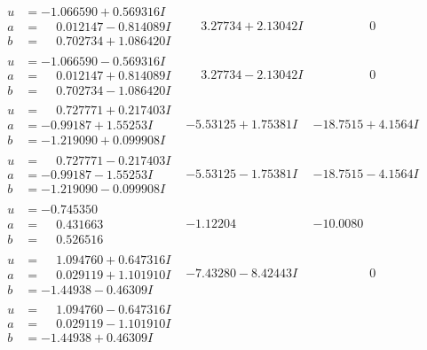 \documentclass[1p]{elsarticle_modified}
\theoremstyle{definition}
\begin{document}
$$\begin{array}{c|c|c}
\begin{aligned}
u &= -1.066590 + 0.569316 I \\
a &= \phantom{-}0.012147 - 0.814089 I \\
b &= \phantom{-}0.702734 + 1.086420 I\end{aligned}
 & \phantom{-}3.27734 + 2.13042 I & \phantom{-0.000000 } 0 \\ \hline\begin{aligned}
u &= -1.066590 - 0.569316 I \\
a &= \phantom{-}0.012147 + 0.814089 I \\
b &= \phantom{-}0.702734 - 1.086420 I\end{aligned}
 & \phantom{-}3.27734 - 2.13042 I & \phantom{-0.000000 } 0 \\ \hline\begin{aligned}
u &= \phantom{-}0.727771 + 0.217403 I \\
a &= -0.99187 + 1.55253 I \\
b &= -1.219090 + 0.099908 I\end{aligned}
 & -5.53125 + 1.75381 I & -18.7515 + 4.1564 I \\ \hline\begin{aligned}
u &= \phantom{-}0.727771 - 0.217403 I \\
a &= -0.99187 - 1.55253 I \\
b &= -1.219090 - 0.099908 I\end{aligned}
 & -5.53125 - 1.75381 I & -18.7515 - 4.1564 I \\ \hline\begin{aligned}
u &= -0.745350\phantom{ +0.000000I} \\
a &= \phantom{-}0.431663\phantom{ +0.000000I} \\
b &= \phantom{-}0.526516\phantom{ +0.000000I}\end{aligned}
 & -1.12204\phantom{ +0.000000I} & -10.0080\phantom{ +0.000000I} \\ \hline\begin{aligned}
u &= \phantom{-}1.094760 + 0.647316 I \\
a &= \phantom{-}0.029119 + 1.101910 I \\
b &= -1.44938 - 0.46309 I\end{aligned}
 & -7.43280 - 8.42443 I & \phantom{-0.000000 } 0 \\ \hline\begin{aligned}
u &= \phantom{-}1.094760 - 0.647316 I \\
a &= \phantom{-}0.029119 - 1.101910 I \\
b &= -1.44938 + 0.46309 I\end{aligned}

\end{array}$$
\end{document}
